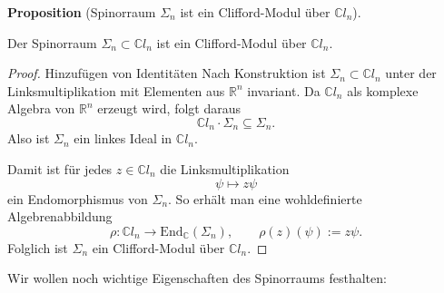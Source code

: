 \documentclass[10pt, letterpaper]{article}
\newcommand{\R}{\mathbb{R}}
\newcommand{\C}{\mathbb{C}}
\newcommand{\End}{\mathrm{End}}
\newcommand{\CustomHeading}[3]{%
  \par\medskip\noindent%
  \textbf{#1 #2} \textnormal{(#3)}.\enskip%
}
\newenvironment{PROP}[2]{\CustomHeading{Proposition}{#1}{#2}}{}
\begin{document}
\begin{PROP}{}{Spinorraum $\Sigma_n$ ist ein Clifford-Modul über $\C l_n$}
Der Spinorraum $\Sigma_n\subset \C l_n$ ist ein Clifford-Modul über $\C l_n$.
\end{PROP}

\begin{proof}
    {\color{blue} Hinzufügen von Identitäten}
    Nach Konstruktion ist $\Sigma_n\subset \C l_n$ unter der Linksmultiplikation mit
    Elementen aus $\R^n$ invariant. Da $\C l_n$ als komplexe Algebra von $\R^n$
    erzeugt wird, folgt daraus
    \[
    \C l_n\cdot \Sigma_n\subseteq \Sigma_n.
    \]
    Also ist $\Sigma_n$ ein linkes Ideal in $\C l_n$.

    Damit ist für jedes $z\in \C l_n$ die Linksmultiplikation
    \[
    \psi\longmapsto z\psi
    \]
    ein Endomorphismus von $\Sigma_n$. So erhält man eine wohldefinierte
    Algebrenabbildung
    \[
    \rho:\C l_n\longrightarrow \End_{\C}(\Sigma_n),
    \qquad
    \rho(z)(\psi):=z\psi.
    \]
    Folglich ist $\Sigma_n$ ein Clifford-Modul über $\C l_n$.
\end{proof}


\bigskip



Wir wollen noch wichtige Eigenschaften des Spinorraums festhalten:
\end{document}
